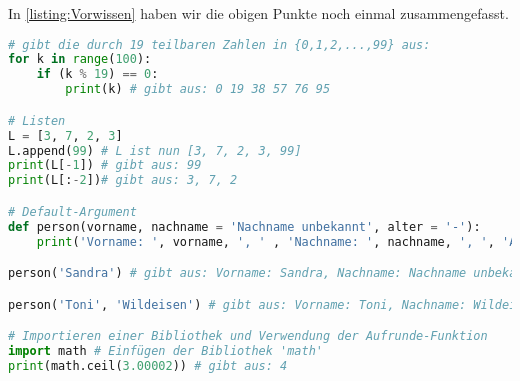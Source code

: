 In \cref{listing:Vorwissen} haben wir die obigen Punkte noch einmal zusammengefasst.
\begin{lstlisting}[language=Python,caption=Vorwissen Python,label=listing:Vorwissen]
# gibt die durch 19 teilbaren Zahlen in {0,1,2,...,99} aus:
for k in range(100):
    if (k % 19) == 0:
        print(k) # gibt aus: 0 19 38 57 76 95

# Listen
L = [3, 7, 2, 3]
L.append(99) # L ist nun [3, 7, 2, 3, 99]
print(L[-1]) # gibt aus: 99
print(L[:-2])# gibt aus: 3, 7, 2

# Default-Argument
def person(vorname, nachname = 'Nachname unbekannt', alter = '-'):
    print('Vorname: ', vorname, ', ' , 'Nachname: ', nachname, ', ', 'Alter: ', alter, sep='')

person('Sandra') # gibt aus: Vorname: Sandra, Nachname: Nachname unbekannt, Alter: -

person('Toni', 'Wildeisen') # gibt aus: Vorname: Toni, Nachname: Wildeisen, Alter: -

# Importieren einer Bibliothek und Verwendung der Aufrunde-Funktion
import math # Einfügen der Bibliothek 'math'
print(math.ceil(3.00002)) # gibt aus: 4
\end{lstlisting}